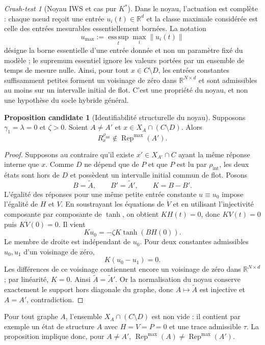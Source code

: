 \documentclass[11pt,a4paper]{article}
\theoremstyle{definition}
\newtheorem{proposition}[definition]{Proposition candidate}
\theoremstyle{remark}
\newtheorem{crashtest}[definition]{Crash-test}
\newcommand{\Rep}{\operatorname{Rep}}
\begin{document}
\begin{crashtest}[Noyau IWS et cas pur $K^*$]
Dans le noyau, l'actuation est complète : chaque nœud reçoit une entrée $u_i(t)\in\mathbb R^d$ et la classe maximale considérée est celle des entrées mesurables essentiellement bornées. La notation
\[
u_{\max}:=\operatorname*{ess\,sup}_{t}\max_i\|u_i(t)\|
\]
désigne la borne essentielle d'une entrée donnée et non un paramètre fixé du modèle ; le supremum essentiel ignore les valeurs portées par un ensemble de temps de mesure nulle. Ainsi, pour tout $x\in C\setminus D$, les entrées constantes suffisamment petites forment un voisinage de zéro dans $\mathbb R^{N\times d}$ et sont admissibles au moins sur un intervalle initial de flot. C'est une propriété du noyau, et non une hypothèse du socle hybride général.

\begin{proposition}[Identifiabilité structurelle du noyau]
Supposons $\gamma_1=\lambda=0$ et $\zeta>0$. Soient $A\neq A'$ et $x\in X_A\cap(C\setminus D)$. Alors
\[
\boxed{
R_x^{\rho_{\mathrm{int}}}\notin\Rep^{\max}(A').}
\]
\end{proposition}

\begin{proof}
Supposons au contraire qu'il existe $x'\in X_{A'}\cap C$ ayant la même réponse interne que $x$. Comme $D$ ne dépend que de $P$ et que $P$ est lu par $\rho_{\mathrm{int}}$, les deux états sont hors de $D$ et possèdent un intervalle initial commun de flot. Posons
\[
B=\widetilde A,
\qquad
B'=\widetilde A',
\qquad
K=B-B'.
\]
L'égalité des réponses pour une même petite entrée constante $u\equiv u_0$ impose l'égalité de $H$ et $V$. En soustrayant les équations de $\dot V$ et en utilisant l'injectivité composante par composante de $\tanh$, on obtient $KH(t)=0$, donc $KV(t)=0$ puis $K\dot V(0)=0$. Il vient
\[
Ku_0=-\zeta K\tanh(BH(0)).
\]
Le membre de droite est indépendant de $u_0$. Pour deux constantes admissibles $u_0,u_1$ d'un voisinage de zéro,
\[
K(u_0-u_1)=0.
\]
Les différences de ce voisinage contiennent encore un voisinage de zéro dans $\mathbb R^{N\times d}$ ; par linéarité, $K=0$. Ainsi $\widetilde A=\widetilde A'$. Or la normalisation du noyau conserve exactement le support hors diagonale du graphe, donc $A\mapsto\widetilde A$ est injective et $A=A'$, contradiction.
\end{proof}

Pour tout graphe $A$, l'ensemble $X_A\cap(C\setminus D)$ est non vide : il contient par exemple un état de structure $A$ avec $H=V=P=0$ et une trace admissible $\tau$. La proposition implique donc, pour $A\neq A'$, $\Rep^{\max}(A)\neq\Rep^{\max}(A')$.


\end{crashtest}
\end{document}
